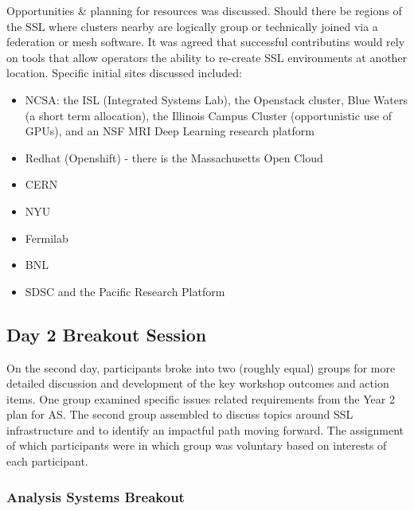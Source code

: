 \documentclass[11pt,letterpaper,fleqn]{article}
\begin{document}
Opportunities \& planning for resources was discussed.  Should there be regions of the SSL where clusters nearby are logically group or technically joined via a federation or mesh software. It was agreed that successful contributins would rely on tools that allow operators the ability to re-create SSL environments at another location.  Specific initial sites discussed included:
\begin{itemize}
  \item NCSA: the ISL (Integrated Systems Lab), the Openstack cluster, Blue Waters (a short term allocation), the Illinois Campus Cluster (opportunistic use of GPUs), and an NSF MRI Deep Learning research platform
  \item Redhat (Openshift) - there is the Massachusetts Open Cloud
  \item CERN
  \item NYU
  \item Fermilab
  \item BNL
  \item SDSC and the Pacific Research Platform
\end{itemize}

\subsection{Day 2 Breakout Session}
On the second day, participants broke into two (roughly equal) groups for more detailed discussion and development of the key workshop outcomes and action items. One group examined specific issues related requirements from the Year 2 plan for AS. The second group assembled to discuss topics around SSL infrastructure and to identify an impactful path moving forward. The assignment of which participants were in which group was voluntary based on interests of each participant.

\subsubsection{Analysis Systems Breakout}
\end{document}
